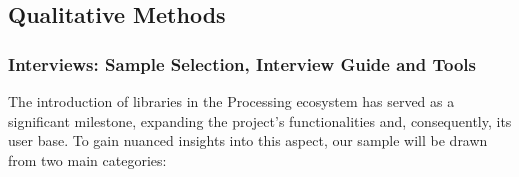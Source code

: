 \documentclass{article}
\begin{document}





    




\subsection{Qualitative Methods}
\subsubsection{Interviews: Sample Selection, Interview Guide and Tools}
The introduction of libraries in the Processing ecosystem has served as a significant milestone, expanding the project's functionalities and, consequently, its user base. To gain nuanced insights into this aspect, our sample will be drawn from two main categories:
\end{document}
